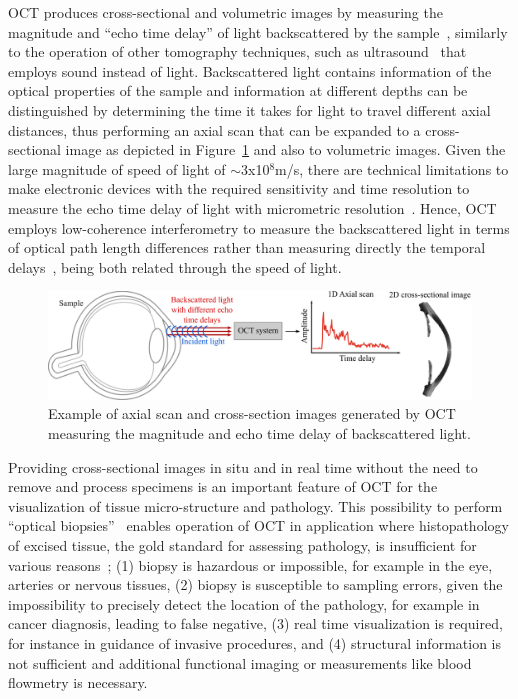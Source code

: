 OCT produces cross-sectional and volumetric images by measuring the magnitude and ``echo time delay'' of light backscattered by the sample~\cite{Huang1991_Optical}, similarly to the operation of other tomography techniques, such as ultrasound~\cite{Hoskins2019_Diagnostic} that employs sound instead of light. Backscattered light contains information of the optical properties of the sample and information at different depths can be distinguished by determining the time it takes for light to travel different axial distances, thus performing an axial scan that can be expanded to a cross-sectional image as depicted in Figure~\ref{fig:BasicOCT} and also to volumetric images. Given the large magnitude of speed of light of $\sim$3x10$^8$m/s, there are technical limitations to make electronic devices with the required sensitivity and time resolution to measure the echo time delay of light with micrometric resolution~\cite{Fujimoto2015_Introduction}. Hence, OCT employs low-coherence interferometry to measure the backscattered light in terms of optical path length differences rather than measuring directly the temporal delays~\cite{Huang1991_Optical}, being both related through the speed of light.

\begin{figure}
    \centering
    \includegraphics[width=\textwidth]{Figures/Introduction/BasicOCT.pdf}
    \caption{Example of axial scan and cross-section images generated by OCT measuring the magnitude and echo time delay of backscattered light.}
    \label{fig:BasicOCT}
\end{figure}

Providing cross-sectional images in situ and in real time without the need to remove and process specimens is an important feature of OCT for the visualization of tissue micro-structure and pathology. This possibility to perform ``optical biopsies''~\cite{Fujimoto1995_Optical} enables operation of OCT in application where histopathology of excised tissue, the gold standard for assessing pathology, is insufficient for various reasons~\cite{Fujimoto2015_Introduction}; (1) biopsy is hazardous or impossible, for example in the eye, arteries or nervous tissues, (2) biopsy is susceptible to sampling errors, given the impossibility to precisely detect the location of the pathology, for example in cancer diagnosis, leading to false negative, (3) real time visualization is required, for instance in guidance of invasive procedures, and (4) structural information is not sufficient and additional functional imaging or measurements like blood flowmetry is necessary.

